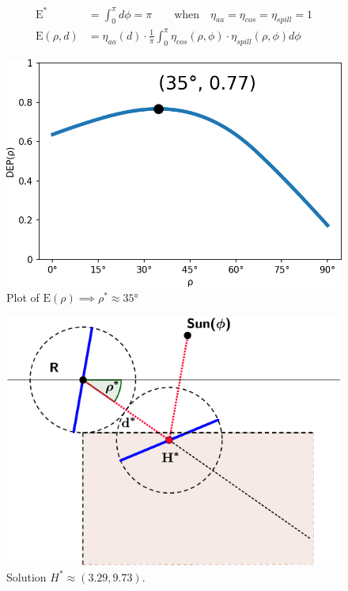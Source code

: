 \documentclass[10pt, xcolor={dvipsnames}]{beamer}
\begin{document}
\begin{frame}
\begin{definition}
\begin{align}
\text{E}^{*} &= \int_{0}^{\pi} d\phi = \pi \qquad  
\text{when} \quad \eta_{aa} = \eta_{cos} = \eta_{spill} = 1
\\[.5em]
\text{E}(\rho, d) &= \eta_{aa}(d) \cdot 
\frac{1}{\pi}\int_{0}^{\pi} 
\eta_{cos}(\rho, \phi) \cdot \eta_{spill}(\rho, \phi)
d\phi
\end{align}
\end{definition}
\begin{minipage}[t]{0.5\textwidth}
\begin{center}
\vspace{1.2cm}
\begin{figure}
\includegraphics[width=.8\textwidth]{../figures/DEP-crop.png}
\caption{Plot of $\text{E}(\rho) \implies \rho^{*} \approx 35$°}
\end{figure}
\end{center}
\end{minipage}%
\begin{minipage}[t]{0.5\textwidth}
\begin{center}
\begin{figure}
\includegraphics[width=\textwidth]{../figures/singleton-solution-crop.pdf}
\caption{Solution $H^{*} \approx (3.29, 9.73)$.}
\end{figure}
\end{center}
\end{minipage}
\end{frame}
\end{document}

